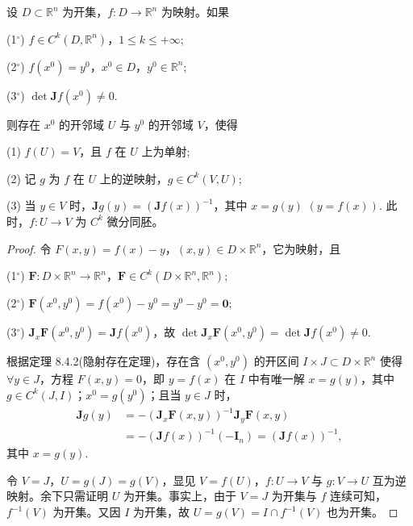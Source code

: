 \begin{theorem}[局部逆射定理]\label{thm:8.4.3}
设 $D \subset \mathbb{R}^{n}$ 为开集，$f: D \to \mathbb{R}^{n}$ 为映射。如果

(1$^\circ$) $f \in C^{k}(D,\mathbb{R}^{n})$，$1 \leqslant k \leqslant +\infty$;

(2$^\circ$) $f(x^{0}) = y^{0}$，$x^{0} \in D$，$y^{0} \in \mathbb{R}^{n}$;

(3$^\circ$) $\det \boldsymbol{J}f(x^{0}) \neq 0$.

则存在 $x^{0}$ 的开邻域 $U$ 与 $y^{0}$ 的开邻域 $V$，使得

(1) $f(U) = V$，且 $f$ 在 $U$ 上为单射;

(2) 记 $g$ 为 $f$ 在 $U$ 上的逆映射，$g \in C^{k}(V,U)$;

(3) 当 $y \in V$ 时，$\boldsymbol{J}g(y) = \left(\boldsymbol{J}f(x)\right)^{-1}$，其中 $x = g(y)$ $(y = f(x))$. 此时，$f: U \to V$ 为 $C^{k}$ 微分同胚。
\end{theorem}

\begin{proof}
令 $F(x,y) = f(x) - y$，$(x,y) \in D \times \mathbb{R}^{n}$，它为映射，且

(1$^\circ$) $\boldsymbol{F}: D \times \mathbb{R}^{n} \to \mathbb{R}^{n}$，$\boldsymbol{F} \in C^{k}(D \times \mathbb{R}^{n},\mathbb{R}^{n})$;

(2$^\circ$) $\boldsymbol{F}(x^{0},y^{0}) = f(x^{0}) - y^{0} = y^{0} - y^{0} = \boldsymbol{0}$;

(3$^\circ$) $\boldsymbol{J}_{x}\boldsymbol{F}(x^{0},y^{0}) = \boldsymbol{J}f(x^{0})$，故 $\det \boldsymbol{J}_{x}\boldsymbol{F}(x^{0},y^{0}) = \det \boldsymbol{J}f(x^{0}) \neq 0$.

根据定理 8.4.2(隐射存在定理)，存在含 $(x^{0},y^{0})$ 的开区间 $I \times J \subset D \times \mathbb{R}^{n}$ 使得 $\forall y \in J$，方程 $F(x,y) = 0$，即 $y = f(x)$ 在 $I$ 中有唯一解 $x = g(y)$，其中 $g \in C^{k}(J,I)$；$x^{0} = g(y^{0})$；且当 $y \in J$ 时，
\begin{align*}
  \boldsymbol{J}g(y) &= -\left(\boldsymbol{J}_{x}\boldsymbol{F}(x,y)\right)^{-1}\boldsymbol{J}_{y}\boldsymbol{F}(x,y) \\
  &= -\left(\boldsymbol{J}f(x)\right)^{-1}(-\boldsymbol{I}_{n}) = \left(\boldsymbol{J}f(x)\right)^{-1},
\end{align*}
其中 $x = g(y)$.

令 $V = J$，$U = g(J) = g(V)$，显见 $V = f(U)$，$f: U \to V$ 与 $g: V \to U$ 互为逆映射。余下只需证明 $U$ 为开集。事实上，由于 $V = J$ 为开集与 $f$ 连续可知，$f^{-1}(V)$ 为开集。又因 $I$ 为开集，故 $U = g(V) = I \cap f^{-1}(V)$ 也为开集。
\end{proof}

